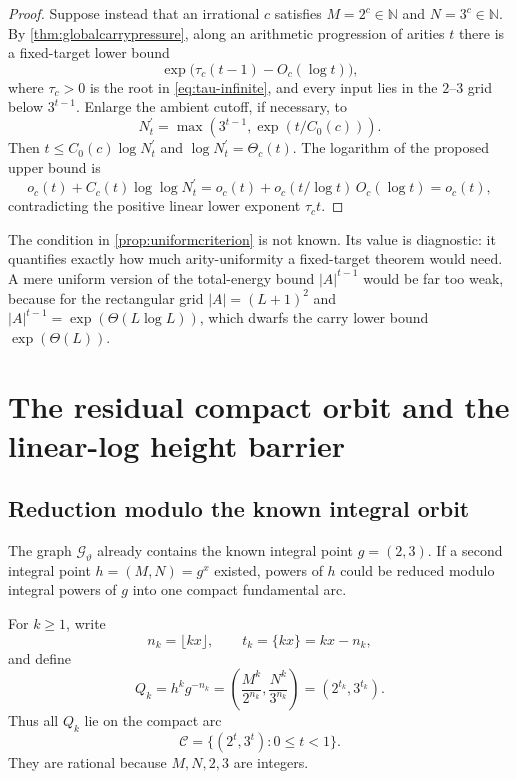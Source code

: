 \documentclass[11pt,oneside]{article}
\theoremstyle{definition}
\newcommand{\N}{\mathbb{N}}
\newcommand{\cC}{\mathscr{C}}
\newcommand{\cG}{\mathscr{G}}
\begin{document}
\begin{proof}
Suppose instead that an irrational $c$ satisfies $M=2^c\in\N$ and $N=3^c\in\N$.  By \cref{thm:globalcarrypressure}, along an arithmetic progression of arities $t$ there is a fixed-target lower bound
\[
       \exp\bigl(\tau_c(t-1)-O_c(\log t)\bigr),
\]
where $\tau_c>0$ is the root in \eqref{eq:tau-infinite}, and every input lies in the $2$--$3$ grid below $3^{t-1}$.  Enlarge the ambient cutoff, if necessary, to
\[
       N_t^{\prime}=\max\!\left(3^{t-1},\exp(t/C_0(c))\right).
\]
Then $t\le C_0(c)\log N_t^{\prime}$ and
$\log N_t^{\prime}=\Theta_c(t)$.  The logarithm of the proposed upper bound is
\[
       o_c(t)+C_c(t)\log\log N_t^{\prime}
       =o_c(t)+o_c(t/\log t)\,O_c(\log t)=o_c(t),
\]
contradicting the positive linear lower exponent $\tau_c t$.
\end{proof}

The condition in \cref{prop:uniformcriterion} is not known.  Its value is diagnostic: it quantifies exactly how much arity-uniformity a fixed-target theorem would need.  A mere uniform version of the total-energy bound
$|A|^{t-1}$ would be far too weak, because for the rectangular grid
$|A|=(L+1)^2$ and $|A|^{t-1}=\exp(\Theta(L\log L))$, which dwarfs the carry lower bound $\exp(\Theta(L))$.

\section{The residual compact orbit and the linear-log height barrier}

\subsection{Reduction modulo the known integral orbit}

The graph $\cG_{\vartheta}$ already contains the known integral point
$g=(2,3)$.  If a second integral point $h=(M,N)=g^x$ existed, powers of $h$ could be reduced modulo integral powers of $g$ into one compact fundamental arc.

For $k\ge1$, write
\[
      n_k=\lfloor kx\rfloor,
      \qquad t_k=\{kx\}=kx-n_k,
\]
and define
\begin{equation}\label{eq:residualorbit}
      Q_k=h^k g^{-n_k}
      =\left(\frac{M^k}{2^{n_k}},
              \frac{N^k}{3^{n_k}}\right)
      =(2^{t_k},3^{t_k}).
\end{equation}
Thus all $Q_k$ lie on the compact arc
\[
      \cC=\{(2^t,3^t):0\le t<1\}.
\]
They are rational because $M,N,2,3$ are integers.
\end{document}
